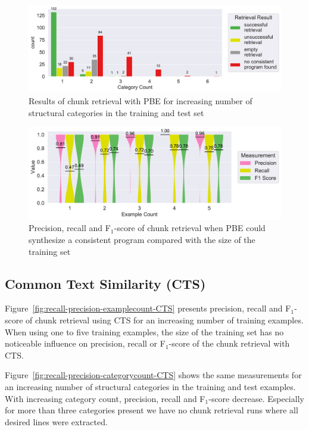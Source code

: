 \documentclass[\myrootdir/main.tex]{subfiles}
\begin{document}
\begin{figure}[htbp]
		\centering
		\includegraphics[width=\textwidth, clip]{img/big-study/failure-reason-categorycount-PBE.pdf}
		\caption{Results of chunk retrieval with PBE for increasing number of structural categories in the training and test set}
		\label{fig:failure-reason-categorycount-PBE}
\end{figure}

\begin{figure}[htbp]
		\centering
		\includegraphics[width=\textwidth, clip]{img/big-study/recall-precision-examplecount-sythesisworked-PBE.pdf}
		\caption{Precision, recall and F$_{1}$-score of chunk retrieval when PBE could synthesize a consistent program compared with the size of the training set}
		\label{fig:recall-precision-examplecount-sythesisworked-PBE}
\end{figure}

\subsection{Common Text Similarity (CTS)}
Figure~\ref{fig:recall-precision-examplecount-CTS} presents precision, recall and F$_{1}$-score of chunk retrieval using CTS for an increasing number of training examples.
When using one to five training examples, the size of the training set has no noticeable influence on precision, recall or F$_{1}$-score of the chunk retrieval with CTS.

Figure~\ref{fig:recall-precision-categorycount-CTS} shows the same measurements for an increasing number of structural categories in the training and test examples.
With increasing category count, precision, recall and F$_{1}$-score decrease.
Especially for more than three categories present we have no chunk retrieval runs where all desired lines were extracted.
\end{document}
